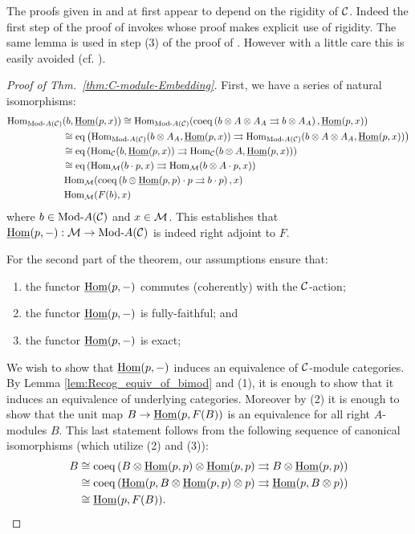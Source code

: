 \documentclass{amsart}
\begin{document}
\noindent The proofs given in \cite{EGNO} and \cite{MR1976459} at first appear to depend on  the rigidity of $\mathcal C$. Indeed the first step of the proof of \cite[Thm 2.11.2]{EGNO} invokes \cite[lemma 2.10.4.(4)]{EGNO} whose proof makes explicit use of rigidity. The same lemma is used in step (3) of the proof of \cite[Thm 1]{MR1976459}. However with a little care this is easily avoided (cf. \cite[Rmk. 2.11.3]{EGNO}). 

\begin{proof}[Proof of Thm.~\ref{thm:C-module-Embedding}]
	First, we have a series of natural isomorphisms:
	\begin{align*}
		\Hom_{\Mod{}{A}(\cC)}&(b, \IHom(p,x))  \cong \Hom_{\Mod{}{A}(\cC)}( \coeq \left( b \otimes A \otimes A_A \rightrightarrows b \otimes A_A  \right), \IHom(p,x)) \\
		& \cong \eq \left( \Hom_{\Mod{}{A}(\cC)}(b \otimes A_A, \IHom(p,x) )  \rightrightarrows \Hom_{\Mod{}{A}(\cC)}(  b \otimes A \otimes A_A, \IHom(p,x))  \right) \\
		& \cong \eq \left( \Hom_{\cC}(b, \IHom(p,x) )  \rightrightarrows \Hom_{\cC}(  b \otimes A, \IHom(p,x))  \right) \\
		& \cong \eq \left( \Hom_{\cM}(b \cdot p, x )  \rightrightarrows \Hom_{\cM}(  b \otimes A \cdot p, x)  \right) \\
		& \Hom_{\cM}( \coeq \left( b \otimes \IHom(p,p) \cdot p \rightrightarrows b \cdot p \right), x) \\
		& \Hom_{\cM}( F(b), x)
	\end{align*}
	where $b \in \Mod{}{A}(\cC)$ and $x \in \mathcal M$. This establishes that $\IHom(p,-): \cM \to \Mod{}{A}(\cC)$ is indeed right adjoint to $F$.

For the second part of the theorem, our assumptions ensure that:
\begin{enumerate}
	\item the functor $\operatorname{\underline{Hom}}(p, -)$ commutes (coherently) with the $\mathcal C$-action;
	\item the functor $\operatorname{\underline{Hom}}(p, -)$ is fully-faithful; and
	\item the functor $\operatorname{\underline{Hom}}(p, -)$ is exact; 
\end{enumerate}
We wish to show that $\operatorname{\underline{Hom}}(p, -)$ induces an equivalence of $\mathcal C$-module categories. By Lemma \ref{lem:Recog_equiv_of_bimod} and (1), it is enough to show that it induces an equivalence of underlying categories. Moreover by (2) it is enough to show that the unit map $B \to \operatorname{\underline{Hom}}(p, F(B))$ is an equivalence for all right $A$-modules $B$. This last statement follows from the following sequence of canonical isomorphisms (which utilize (2) and (3)):
\begin{align*}
	B & \cong \operatorname{coeq} \left( B \otimes \operatorname{\underline{Hom}}(p,p) \otimes \operatorname{\underline{Hom}}(p,p) \rightrightarrows B \otimes \operatorname{\underline{Hom}}(p,p) \right)\\
	& \cong \operatorname{coeq} \left(\operatorname{\underline{Hom}}(p,B  \otimes \operatorname{\underline{Hom}}(p,p) \otimes p) \rightrightarrows \operatorname{\underline{Hom}}(p,B \otimes p) \right)\\
	& \cong \operatorname{\underline{Hom}}(p, F(B)). \qedhere
\end{align*}	
\end{proof}
\end{document}

